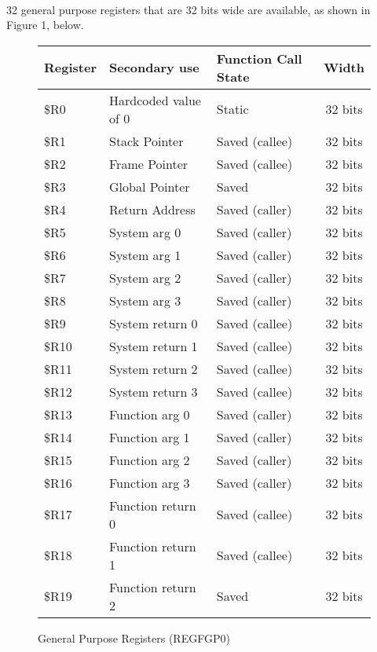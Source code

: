 \documentclass[letterpaper, 11pt]{article}
\begin{document}
\paragraph{}32 general purpose registers that are 32 bits wide are available, as shown in Figure 1, below.
\begin{figure}[!h]
	\begin{center}
				\caption{General Purpose Registers (REGFGP0)}
		\begin{tabular}{|l|l|l|c|}
			\hline
			Register & Secondary use & Function Call State & Width \\ \hline
			\$R0  & Hardcoded value of 0 & Static & 32 bits\\ 	\hline
			\$R1  & Stack Pointer & Saved (callee) & 32 bits\\ 	\hline
			\$R2  & Frame Pointer & Saved (callee) &32 bits\\ 	\hline
			\$R3  & Global Pointer & Saved &32 bits\\ 	\hline
			\$R4  & Return Address & Saved (caller) &32 bits\\ 	\hline
			\$R5  & System arg 0 & Saved (caller) &32 bits\\ 	\hline
			\$R6  & System arg 1 & Saved (caller) &32 bits\\ 	\hline
			\$R7  & System arg 2 & Saved (caller) &32 bits\\ 	\hline
			\$R8  & System arg 3 & Saved (caller) &32 bits\\ 	\hline
			\$R9  & System return 0 & Saved (callee) &32 bits\\ 	\hline
			\$R10 & System return 1 & Saved (callee) &32 bits\\ \hline
			\$R11 & System return 2 & Saved (callee) &32 bits \\ \hline
			\$R12 & System return 3 & Saved (callee) &32 bits \\ \hline
			\$R13 & Function arg 0 & Saved (caller) &32 bits \\ \hline
			\$R14 & Function arg 1 & Saved (caller) &32 bits \\ \hline
			\$R15 & Function arg 2 & Saved (caller) &32 bits \\ \hline
			\$R16 & Function arg 3 & Saved (caller) &32 bits \\ \hline
			\$R17 & Function return 0 & Saved (callee) &32 bits \\ \hline
			\$R18 & Function return 1 & Saved (callee) &32 bits \\ \hline
			\$R19 & Function return 2 & Saved &32 bits \\ \hline

\end{tabular}
\end{center}
\end{figure}
\end{document}
